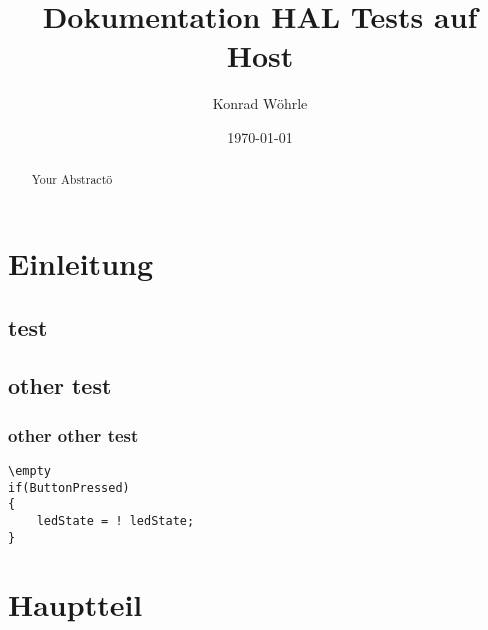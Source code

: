 \documentclass[12pt,a4paper]{article}
\title{Dokumentation HAL Tests auf Host}
\author{Konrad Wöhrle}
\date{\today}
\begin{document}
\maketitle
\tableofcontents
\newpage

\section{Einleitung}

\subsection{test}
\subsection{other test}
\subsubsection{other other test}
\empty
\begin{verbatim}
\empty
if(ButtonPressed)
{
    ledState = ! ledState;
}
\end{verbatim}

\section{Hauptteil}

\section{}

\begin{abstract}
Your Abstractö
\end{abstract}
\end{document}
